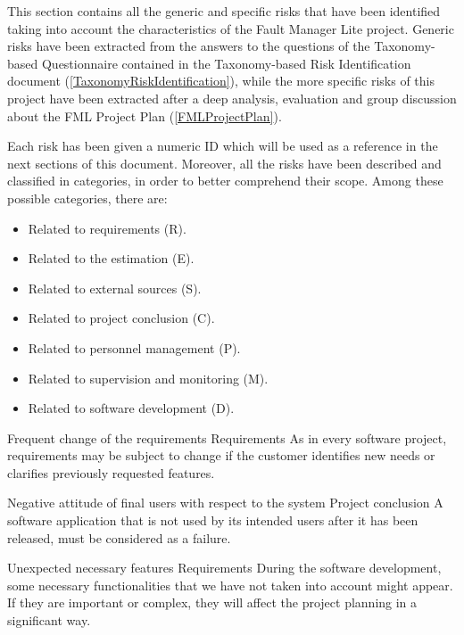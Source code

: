 
This section contains all the generic and specific risks that have been identified taking into account the characteristics of the Fault Manager Lite project. Generic risks have been extracted from the answers to the questions of the Taxonomy-based Questionnaire contained in the Taxonomy-based Risk Identification document (\ref{TaxonomyRiskIdentification}), while the more specific risks of this project have been extracted after a deep analysis, evaluation and group discussion about the FML Project Plan (\ref{FMLProjectPlan}).

Each risk has been given a numeric ID which will be used as a reference in the next sections of this document. Moreover, all the risks have been described and classified in categories, in order to better comprehend their scope.
Among these possible categories, there are:
\begin{itemize}
\item Related to requirements (R).
\item Related to the estimation (E).
\item Related to external sources (S).
\item Related to project conclusion (C).
\item Related to personnel management (P).
\item Related to supervision and monitoring (M).
\item Related to software development (D).
\end{itemize}

\begin{risk}{Frequent change of the requirements}
\label{riskReqChange}
\riskcat Requirements
\riskdesc As in every software project, requirements may be subject to change if the customer identifies new needs or clarifies previously requested features.
\end{risk}

\begin{risk}{Negative attitude of final users with respect to the system}
\label{riskAttitude}
\riskcat Project conclusion
\riskdesc A software application that is not used by its intended users after it has been released, must be considered as a failure.
\end{risk}

\begin{risk}{Unexpected necessary features}
\label{riskFeaturesUnexpected}
\riskcat Requirements
\riskdesc During the software development, some necessary functionalities that we have not taken into account might appear. If they are important or complex, they will affect the project planning in a significant way.
\end{risk}

